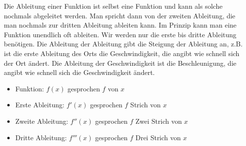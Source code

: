 Die Ableitung einer Funktion ist selbst eine Funktion und kann als solche nochmals abgeleitet werden. Man spricht dann von der zweiten Ableitung, die man nochmals zur dritten Ableitung ableiten kann. Im Prinzip kann man eine Funktion unendlich oft ableiten. Wir werden nur die erste bis dritte Ableitung benötigen. Die Ableitung der Ableitung gibt die Steigung der Ableitung an, z.B. ist die erste Ableitung des Orts die Geschwindigkeit, die angibt wie schnell sich der Ort ändert. Die Ableitung der Geschwindigkeit ist die Beschleunigung, die angibt wie schnell sich die Geschwindigkeit ändert.
\begin{itemize}
	\item Funktion: \textcolor{loes}{\(f(x)\) gesprochen \(f\) von \(x\)}\\
	\item Erste Ableitung: \textcolor{loes}{\(f'(x)\) gesprochen \(f\) Strich von \(x\)}\\
	\item Zweite Ableitung: \textcolor{loes}{\(f''(x)\) gesprochen \(f\) Zwei Strich von \(x\)}\\
	\item Dritte Ableitung: \textcolor{loes}{\(f'''(x)\) gesprochen \(f\) Drei Strich von \(x\)}\\
\end{itemize}

